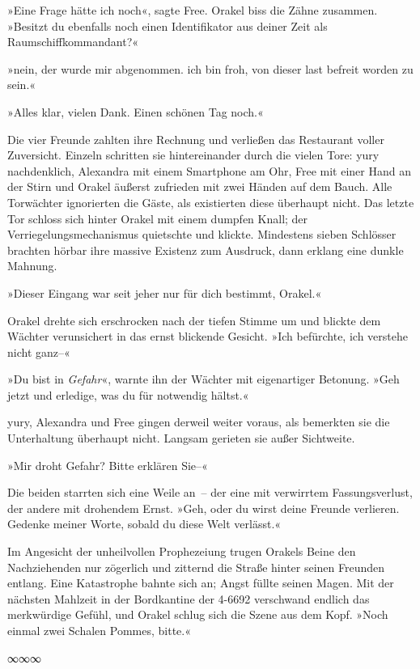 »Eine Frage hätte ich noch«, sagte Free. Orakel biss die Zähne zusammen. »Besitzt du ebenfalls noch einen Identifikator aus deiner Zeit als Raumschiffkommandant?«

»nein, der wurde mir abgenommen. ich bin froh, von dieser last befreit worden zu sein.«

»Alles klar, vielen Dank. Einen schönen Tag noch.«

Die vier Freunde zahlten ihre Rechnung und verließen das Restaurant voller Zuversicht. Einzeln schritten sie hintereinander durch die vielen Tore: yury nachdenklich, Alexandra mit einem Smartphone am Ohr, Free mit einer Hand an der Stirn und Orakel äußerst zufrieden mit zwei Händen auf dem Bauch. Alle Torwächter ignorierten die Gäste, als existierten diese überhaupt nicht. Das letzte Tor schloss sich hinter Orakel mit einem dumpfen Knall; der Verriegelungsmechanismus quietschte und klickte. Mindestens sieben Schlösser brachten hörbar ihre massive Existenz zum Ausdruck, dann erklang eine dunkle Mahnung.

»Dieser Eingang war seit jeher nur für dich bestimmt, Orakel.«

Orakel drehte sich erschrocken nach der tiefen Stimme um und blickte dem Wächter verunsichert in das ernst blickende Gesicht. »Ich befürchte, ich verstehe nicht ganz–«

»Du bist in \emph{Gefahr}«, warnte ihn der Wächter mit eigenartiger Betonung. »Geh jetzt und erledige, was du für notwendig hältst.«

yury, Alexandra und Free gingen derweil weiter voraus, als bemerkten sie die Unterhaltung überhaupt nicht. Langsam gerieten sie außer Sichtweite.

»Mir droht Gefahr? Bitte erklären Sie–«

 Die beiden starrten sich eine Weile an~– der eine mit verwirrtem Fassungsverlust, der andere mit drohendem Ernst. »Geh, oder du wirst deine Freunde verlieren. Gedenke meiner Worte, sobald du diese Welt verlässt.«

Im Angesicht der unheilvollen Prophezeiung trugen Orakels Beine den Nachziehenden nur zögerlich und zitternd die Straße hinter seinen Freunden entlang. Eine Katastrophe bahnte sich an; Angst füllte seinen Magen. Mit der nächsten Mahlzeit in der Bordkantine der 4-6692 verschwand endlich das merkwürdige Gefühl, und Orakel schlug sich die Szene aus dem Kopf. »Noch einmal zwei Schalen Pommes, bitte.«

\begin{center}
∞∞∞
\end{center}

